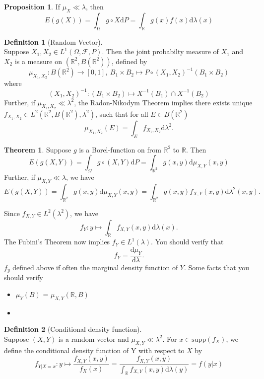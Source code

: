 \documentclass[12pt]{book}
\theoremstyle{definition}
\newtheorem{definition}{Definition}[chapter]
\newtheorem{theorem}{Theorem}[chapter]
\newtheorem{proposition}{Proposition}[section]
\newcommand{\R}{\mathbb{R}}
\newcommand{\D}{\mathrm{d}}
\begin{document}
\begin{proposition}
If $\mu_X \ll \lambda$, then
$$
E(g(X))=\int_\Omega g \circ X \D P = \int_\R g(x)f(x) \D \lambda (x)
$$

\end{proposition}


\begin{definition}[Random Vector] \ \\
Suppose $X_1,X_2 \in L^1(\Omega,\mathcal F,P)$. Then the joint probabilty measure	of $X_1$ and $X_2$ is a measure on $(\R^2,B(\R^2))$, defined by
$$
\mu_{X_1,X_2} : B(\R^2) \to [0,1], \ B_1\times B_2 \mapsto P \circ (X_1,X_2)^{-1}(B_1\times B_2)
$$
where
$$
(X_1,X_2)^{-1}: (B_1\times B_2) \mapsto X^{-1}(B_1)\cap X^{-1}(B_2)
$$
Further, if $\mu_{X_1,X_2} \ll \lambda^2$, the Radon-Nikodym Theorem implies there exists unique $f_{X_1,X_2}\in L^2(\R^2,B(\R^2),\lambda^2)$, such that for all $E\in B(\R^2)$
$$
\mu_{X_1,X_2}(E) = \int_E f_{X_1,X_2} \D \lambda^2.
$$
\end{definition}

\begin{theorem}
Suppose $g$ is a Borel-function on from $\R^2$ to $\R$. Then 
$$
E(g(X,Y))=\int_\Omega g\circ (X,Y) \D P = \int_{\R^2} g(x,y) \D \mu_{X,Y}(x,y)
$$
Further, if $\mu_{X,Y} \ll \lambda$, we have
$$
E(g(X,Y))=\int_{\R^2} g(x,y) \D \mu_{X,Y}(x,y)= \int_{\R^2} g(x,y)f_{X,Y}(x,y)\D \lambda^2(x,y).
$$
\end{theorem}
Since $f_{X,Y} \in L^2(\lambda^2)$, we have
$$
f_Y :y \mapsto \int_{\R} f_{X,Y}(x,y)\D \lambda(x).
$$
The Fubini's Theorem now implies $f_Y\in L^1(\lambda)$. You should verify that 
$$
f_Y =\frac{\D  \mu_Y}{\D \lambda}.
$$
$f_y$ defined above if often the marginal density function of $Y$.
Some facts that you should verify 
\begin{itemize}
	\item $\mu_Y(B)$ = $\mu_{X,Y}(\R,B)$
	\item 
\end{itemize}

\begin{definition}[Conditional density function] \ \\
Suppose $(X,Y)$ is a random vector and $\mu_{X,Y} \ll \lambda^2$.
For $x \in \mathrm{supp}(f_X)$, we define the conditional density function of 
Y with respect to $X$ by
	$$f_{Y|X=x}: y \mapsto \frac{f_{X,Y}(x,y)}{f_X(x)}=\frac{f_{X,Y}(x,y)}{\int_{\R}f_{X,Y}(x,y)\D \lambda(y)}=f(y|x)$$
\end{definition}
\end{document}

